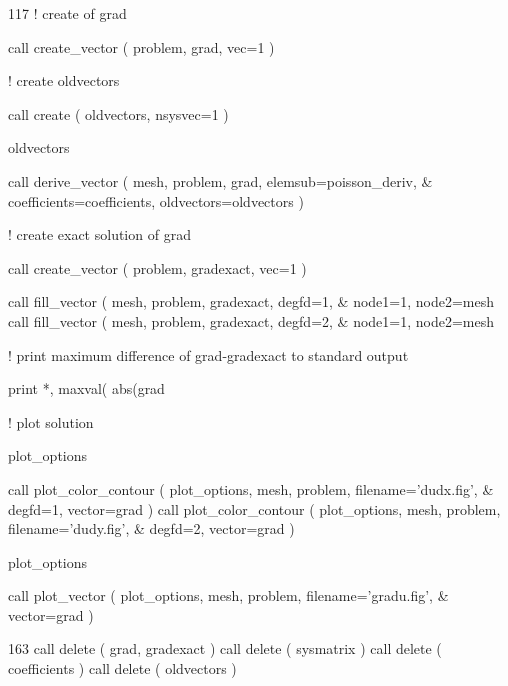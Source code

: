 \begin{listing}{117}
! create of grad
                                                                                
  call create_vector ( problem, grad, vec=1 )

! create oldvectors

  call create ( oldvectors, nsysvec=1 )
                                                                                
  oldvectors%

  call derive_vector ( mesh, problem, grad, elemsub=poisson_deriv, &
    coefficients=coefficients, oldvectors=oldvectors )
                                                                                
! create exact solution of grad
                                                                                
  call create_vector ( problem, gradexact, vec=1 )
                                                                                
  call fill_vector ( mesh, problem, gradexact, degfd=1, &
    node1=1, node2=mesh%
  call fill_vector ( mesh, problem, gradexact, degfd=2, &
    node1=1, node2=mesh%
                                                                                
! print maximum difference of grad-gradexact to standard output
                                                                                
  print *, maxval( abs(grad%
                                                                                
! plot solution

  plot_options%

  call plot_color_contour ( plot_options, mesh, problem, filename='dudx.fig', &
    degfd=1, vector=grad )
  call plot_color_contour ( plot_options, mesh, problem, filename='dudy.fig', &
    degfd=2, vector=grad )

  plot_options%

  call plot_vector ( plot_options, mesh, problem, filename='gradu.fig', &
    vector=grad )

\end{listing}
\bigskip
\begin{listing}{163}
  call delete ( grad, gradexact )
  call delete ( sysmatrix )
  call delete ( coefficients )
  call delete ( oldvectors )
\end{listing}

